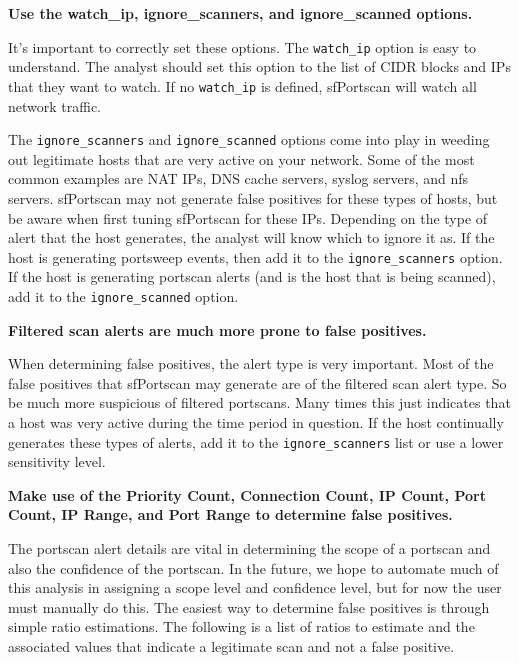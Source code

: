 \documentclass[english]{report}
\newcounter{slistnum}
\newenvironment{slist}
{ \begin{list}{ {\bf \arabic{slistnum}.} }{\usecounter{slistnum} } }
{ \end{list} }
\begin{document}
\begin{slist}

\item \textbf{Use the watch\_ip, ignore\_scanners, and ignore\_scanned options.}
  
It's important to correctly set these options.  The \texttt{watch\_ip} option
is easy to understand.  The analyst should set this option to the list of CIDR
blocks and IPs that they want to watch.  If no \texttt{watch\_ip} is defined,
sfPortscan will watch all network traffic.
     
The \texttt{ignore\_scanners} and \texttt{ignore\_scanned} options come into
play in weeding out legitimate hosts that are very active on your network.
Some of the most common examples are NAT IPs, DNS cache servers, syslog
servers, and nfs servers.  sfPortscan may not generate false positives for
these types of hosts, but be aware when first tuning sfPortscan for these IPs.
Depending on the type of alert that the host generates, the analyst will know
which to ignore it as.  If the host is generating portsweep events, then add it
to the \texttt{ignore\_scanners} option.  If the host is generating portscan
alerts (and is the host that is being scanned), add it to the
\texttt{ignore\_scanned} option.
  
\item \textbf{Filtered scan alerts are much more prone to false positives.}
  
When determining false positives, the alert type is very important.  Most of
the false positives that sfPortscan may generate are of the filtered scan alert
type.  So be much more suspicious of filtered portscans.  Many times this just
indicates that a host was very active during the time period in question.  If
the host continually generates these types of alerts, add it to the
\texttt{ignore\_scanners} list or use a lower sensitivity level.
     
\item \textbf{Make use of the Priority Count, Connection Count, IP Count, Port
Count, IP Range, and Port Range to determine false positives.}
     
The portscan alert details are vital in determining the scope of a portscan and
also the confidence of the portscan.  In the future, we hope to automate much
of this analysis in assigning a scope level and confidence level, but for now
the user must manually do this.  The easiest way to determine false positives
is through simple ratio estimations.  The following is a list of ratios to
estimate and the associated values that indicate a legitimate scan and not a
false positive.
     

\end{slist}
\end{document}

